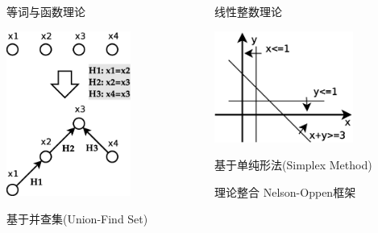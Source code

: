 \documentclass{beamer}
\begin{document}
\begin{frame}[fragile]
    \begin{columns}
      
      \begin{column}{0.5\textwidth}
        \begin{block}{等词与函数理论}
          \begin{center}
            \includegraphics[width=0.65\textwidth]{euf.eps}
          \end{center}
          基于并查集(Union-Find Set)
        \end{block}
      \end{column}

      \begin{column}{0.5\textwidth}
        \begin{block}{线性整数理论}
          \begin{center}
          \includegraphics[width=0.7\textwidth]{arith.eps}
          \end{center}
          基于单纯形法(Simplex Method)
        \end{block}
        \begin{block}{理论整合}
          Nelson-Oppen框架
        \end{block}
      \end{column}


\end{columns}
\end{frame}
\end{document}
